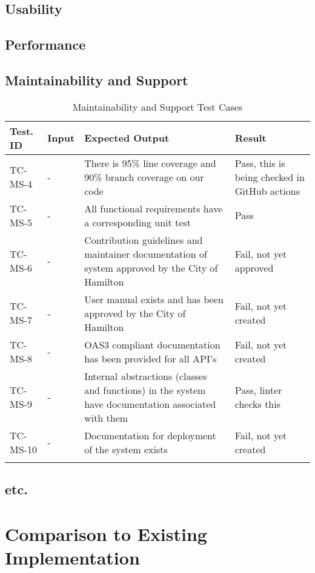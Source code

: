 \documentclass[12pt, titlepage]{article}
\begin{document}
\subsection{Usability}

\subsection{Performance}

\subsection{Maintainability and Support}

\begin{longtable}{|m{2cm}|m{1cm}|m{6cm}|m{3cm}|}
  \hline
  \textbf{Test. ID} & \textbf{Input} & \textbf{Expected Output} &
  \textbf{Result} \\
  \hline
  TC-MS-4 & - & There is 95\% line coverage and 90\% branch coverage
  on our code & Pass, this is being checked in GitHub actions\\ \hline
  TC-MS-5 & - & All functional requirements have a corresponding unit
  test & Pass\\ \hline
  TC-MS-6 & - & Contribution guidelines and maintainer documentation
  of system approved by the City of Hamilton & Fail, not yet approved\\ \hline
  TC-MS-7 & - & User manual exists and has been approved by the City
  of Hamilton & Fail, not yet created\\ \hline
  TC-MS-8 & - & OAS3 compliant documentation has been provided for
  all API's & Fail, not yet created\\ \hline
  TC-MS-9 & - & Internal abstractions (classes and functions) in the
  system have documentation associated with them & Pass, linter
  checks this\\ \hline
  TC-MS-10 & - & Documentation for deployment of the system exists &
  Fail, not yet created\\ \hline
  \caption{Maintainability and Support Test Cases}
\end{longtable}

\subsection{etc.}

\section{Comparison to Existing Implementation}
\end{document}
